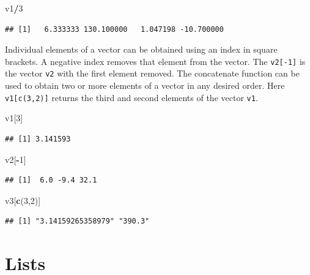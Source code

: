 \documentclass[
]{book}
\newenvironment{Shaded}{\begin{snugshade}}{\end{snugshade}}
\newcommand{\DecValTok}[1]{\textcolor[rgb]{0.00,0.00,0.81}{#1}}
\newcommand{\KeywordTok}[1]{\textcolor[rgb]{0.13,0.29,0.53}{\textbf{#1}}}
\newcommand{\NormalTok}[1]{#1}
\newcommand{\OperatorTok}[1]{\textcolor[rgb]{0.81,0.36,0.00}{\textbf{#1}}}
\begin{document}
\begin{Shaded}
\begin{Highlighting}[]
\NormalTok{v1}\OperatorTok{/}\DecValTok{3}
\end{Highlighting}
\end{Shaded}

\begin{verbatim}
## [1]   6.333333 130.100000   1.047198 -10.700000
\end{verbatim}

Individual elements of a vector can be obtained using an index in square brackets. A negative index removes that element from the vector. The \texttt{v2{[}-1{]}} is the vector \texttt{v2} with the first element removed. The concatenate function can be used to obtain two or more elements of a vector in any desired order. Here \texttt{v1{[}c(3,2){]}} returns the third and second elements of the vector \texttt{v1}.

\begin{Shaded}
\begin{Highlighting}[]
\NormalTok{v1[}\DecValTok{3}\NormalTok{]}
\end{Highlighting}
\end{Shaded}

\begin{verbatim}
## [1] 3.141593
\end{verbatim}

\begin{Shaded}
\begin{Highlighting}[]
\NormalTok{v2[}\OperatorTok{-}\DecValTok{1}\NormalTok{]}
\end{Highlighting}
\end{Shaded}

\begin{verbatim}
## [1]  6.0 -9.4 32.1
\end{verbatim}

\begin{Shaded}
\begin{Highlighting}[]
\NormalTok{v3[}\KeywordTok{c}\NormalTok{(}\DecValTok{3}\NormalTok{,}\DecValTok{2}\NormalTok{)]}
\end{Highlighting}
\end{Shaded}

\begin{verbatim}
## [1] "3.14159265358979" "390.3"
\end{verbatim}

\hypertarget{lists}{%
\section{Lists}\label{lists}}
\end{document}
